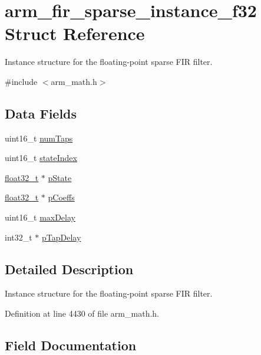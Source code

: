 \hypertarget{structarm__fir__sparse__instance__f32}{}\section{arm\+\_\+fir\+\_\+sparse\+\_\+instance\+\_\+f32 Struct Reference}
\label{structarm__fir__sparse__instance__f32}


Instance structure for the floating-\/point sparse F\+IR filter.  




{\ttfamily \#include $<$arm\+\_\+math.\+h$>$}

\subsection*{Data Fields}
\begin{DoxyCompactItemize}
\item 
uint16\+\_\+t \hyperlink{structarm__fir__sparse__instance__f32_a751941891e47f522a7f5375fe8990aac}{num\+Taps}
\item 
uint16\+\_\+t \hyperlink{structarm__fir__sparse__instance__f32_a566a0cb53437e48b9a3bf18e5b03d8aa}{state\+Index}
\item 
\hyperlink{arm__math_8h_a4611b605e45ab401f02cab15c5e38715}{float32\+\_\+t} $\ast$ \hyperlink{structarm__fir__sparse__instance__f32_a335c87e6fdc4b96601d95a5de8b9c463}{p\+State}
\item 
\hyperlink{arm__math_8h_a4611b605e45ab401f02cab15c5e38715}{float32\+\_\+t} $\ast$ \hyperlink{structarm__fir__sparse__instance__f32_aacbb8dd8eeba4b21fc2bb40076405ee3}{p\+Coeffs}
\item 
uint16\+\_\+t \hyperlink{structarm__fir__sparse__instance__f32_ab25f4ee7550e6d92acff77ada283733f}{max\+Delay}
\item 
int32\+\_\+t $\ast$ \hyperlink{structarm__fir__sparse__instance__f32_adec00b3793ab4f08edfeb4ea6a9eb6e6}{p\+Tap\+Delay}
\end{DoxyCompactItemize}


\subsection{Detailed Description}
Instance structure for the floating-\/point sparse F\+IR filter. 

Definition at line 4430 of file arm\+\_\+math.\+h.



\subsection{Field Documentation}

